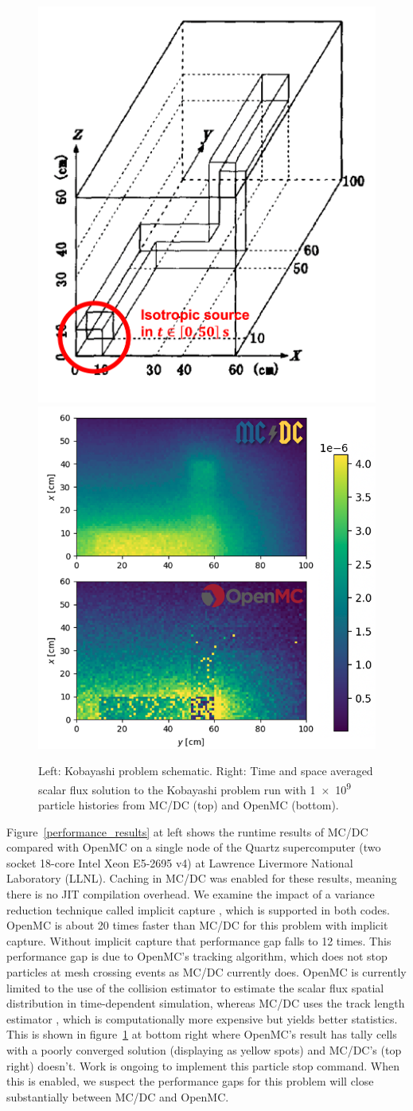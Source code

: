 \begin{figure}[h]
    \centering
    \includegraphics[width=.4\textwidth]{figures/results/kobayashi_problem.png} \hspace{1cm}
    \includegraphics[width=.5\textwidth]{figures/results/koby_mcdcopenmc.png}
    \caption{Left: Kobayashi problem schematic. Right: Time and space averaged scalar flux solution to the Kobayashi problem run with \num{1e9} particle histories from MC/DC (top) and OpenMC (bottom).}
    \label{koby-problem}
\end{figure}

Figure~\ref{performance_results} at left shows the runtime results of MC/DC compared with OpenMC on a single node of the Quartz supercomputer (two socket 18-core Intel Xeon E5-2695 v4) at Lawrence Livermore National Laboratory (LLNL).
Caching in MC/DC was enabled for these results, meaning there is no JIT compilation overhead.
We examine the impact of a variance reduction technique called implicit capture \cite{lewis_computational_1984}, which is supported in both codes.
OpenMC is about 20 times faster than MC/DC for this problem with implicit capture.
Without implicit capture that performance gap falls to 12 times.
This performance gap is due to OpenMC's tracking algorithm, which does not stop particles at mesh crossing events as MC/DC currently does.
OpenMC is currently limited to the use of the collision estimator to estimate the scalar flux spatial distribution in time-dependent simulation, whereas MC/DC uses the track length estimator \cite{lewis_computational_1984}, which is computationally more expensive but yields better statistics.
This is shown in figure~\ref{koby-problem} at bottom right where OpenMC's result has tally cells with a poorly converged solution (displaying as yellow spots) and MC/DC's (top right) doesn't.
Work is ongoing to implement this particle stop command.
When this is enabled, we suspect the performance gaps for this problem will close substantially between MC/DC and OpenMC.

